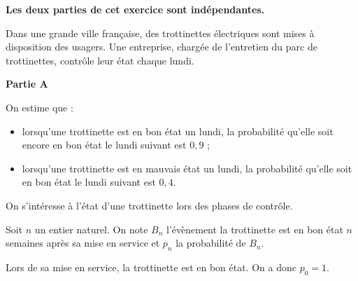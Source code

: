 \medskip

\textbf{Les deux parties de cet exercice sont indépendantes.}

\medskip

Dans une grande ville française, des trottinettes électriques sont mises à disposition des usagers. Une entreprise, chargée de l'entretien du parc de trottinettes, contrôle leur état chaque lundi.

\medskip

\textbf{Partie A}

\medskip

On estime que :
\begin{itemize}
\item lorsqu'une trottinette est en bon état un lundi, la probabilité qu'elle soit encore en bon état le lundi suivant est $0,9$ ;
\item lorsqu'une trottinette est en mauvais état un lundi, la probabilité qu'elle soit en bon état le lundi suivant est $0,4$.
\end{itemize}

\smallskip

On s'intéresse à l'état d'une trottinette lors des phases de contrôle.

Soit $n$ un entier naturel.
On note $B_n$ l'évènement \og la trottinette est en bon état $n$ semaines après sa mise en service\fg{} et $p_n$ la probabilité de $B_n$.

Lors de sa mise en service, la trottinette est en bon état. 
On a donc $p_0 = 1$.

\medskip

